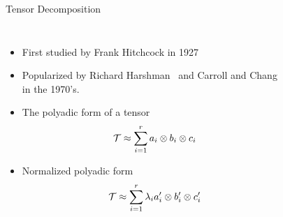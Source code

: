 \documentclass[handout]{beamer}
\begin{document}
\begin{frame}{Tensor Decomposition}
\begin{columns}

  \begin{itemize}[<+->]
      \small
\item First studied by Frank Hitchcock in 1927~\cite{hitchcock1927}
\item Popularized by Richard Harshman~\cite{harshman1970} and Carroll
  and Chang~\cite{carroll1970} in the 1970's.
\item The polyadic form of a tensor
  \[
      \mathcal{T} \approx \displaystyle\sum_{i=1}^{r} a_i \otimes b_i
  \otimes c_i
\]
\item Normalized polyadic form
  \[
      \mathcal{T} \approx \displaystyle\sum_{i=1}^{r} \lambda_i a'_i
  \otimes b'_i \otimes c'_i
  \]
\end{itemize}
\begin{figure}
  \centering
\end{figure}
\end{columns}
\end{frame}
\end{document}
